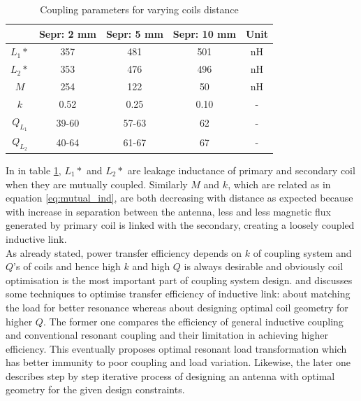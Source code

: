 \documentclass[12pt,a4paper,UKenglish]{report}
\begin{document}
\begin{table}[htbp]
\caption{Coupling parameters for varying coils distance} 
\begin{center}
\begin{tabular}{c|c|c|c|c}
\hline \hline
 			& \textbf{Sepr: 2 mm}	& \textbf{Sepr: 5 mm} 	& \textbf{Sepr: 10 mm}	& \textbf{Unit}\\ \hline \hline
$L_{1}*$		& 357					& 481				& 501				& \si{\nano\henry} \\ \hline
$L_{2}*$		& 353					& 476				& 496				& \si{\nano\henry} \\ \hline
$M$			& 254					& 122					& 50					& \si{\nano\henry} \\ \hline
$k$			& 0.52					& 0.25					& 0.10					& -		   \\ \hline
$Q_{L_{1}}$	& 39-60					& 57-63					& 62	 				& -		   \\ \hline
$Q_{L_{2}}$	& 40-64					& 61-67					& 67	 				& -		   \\
\hline \hline
\end{tabular}
\end{center}
\label{tab:ant_couple_parameter}
\end{table}%

In in table \ref{tab:ant_couple_parameter}, $L_{1}*$ and $L_{2}*$ are leakage inductance of primary 
and secondary coil when they are mutually coupled. Similarly $M$ and $k$, which are related as in equation \ref{eq:mutual_ind}, are both decreasing with distance as expected because with 
increase in separation between the antenna, less and less magnetic flux generated by primary coil is linked with the secondary, creating a loosely
coupled inductive link. \\

As already stated, power transfer efficiency depends on $k$ of coupling system and $Q$'s of coils and hence high $k$ and high $Q$ is always desirable and obviously 
coil optimisation is the most important part of coupling system design. \cite{ant_optimal_resonance} and \cite{ant_PSC_geometry} 
discusses some techniques to optimise transfer efficiency of inductive link: \cite{ant_optimal_resonance} about matching the 
load for better resonance whereas \cite{ant_PSC_geometry} about designing optimal coil geometry for higher $Q$. The former one 
compares the efficiency of general inductive coupling and conventional resonant coupling and their limitation in achieving 
higher efficiency. This eventually proposes optimal resonant load transformation which has better immunity to poor coupling 
and load variation. Likewise, the later one describes step by step iterative process of designing an antenna with optimal geometry for the given 
design constraints. \\
\end{document}
